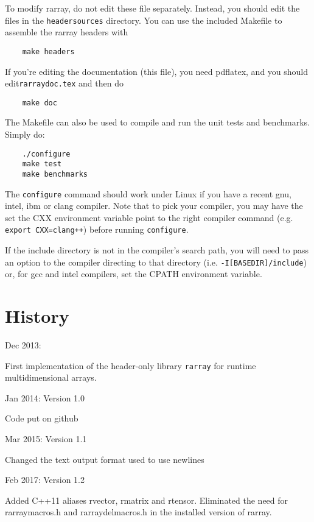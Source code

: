 \documentclass[11pt,twoside]{article}
\begin{document}
To modify rarray, do not edit these file separately. Instead, you
should edit the files in the \texttt{headersources} directory.  You
can use the included Makefile to assemble the rarray headers with
\begin{verbatim}
    make headers
\end{verbatim}

If you're editing the documentation (this file), you need pdflatex, and you should edit\linebreak \texttt{rarraydoc.tex} and then do
\begin{verbatim}
    make doc
\end{verbatim}

The Makefile can also be used to compile and run the unit tests and benchmarks. Simply do:
\begin{verbatim}
    ./configure
    make test
    make benchmarks
\end{verbatim}
The \texttt{configure} command should work under Linux if you have a recent
gnu, intel, ibm or clang compiler.  Note that to pick your compiler,
you may have the set the CXX environment variable point to the right
compiler command (e.g. \texttt{export CXX=clang++}) before running \texttt{configure}.

If the include directory is not in the compiler's search path, you
will need to pass an option to the compiler directing to that
directory (i.e. \texttt{-I[BASEDIR]/include}) or, for gcc and intel compilers,
set the CPATH environment variable.

\newpage

\section{History}

Dec 2013:

First implementation of the header-only library \texttt{rarray} for runtime multidimensional arrays.

\noindent
Jan 2014: Version 1.0

Code put on github

\noindent
Mar 2015: Version 1.1

Changed the text output format used to use newlines

\noindent
Feb 2017: Version 1.2

Added C++11 aliases rvector, rmatrix and rtensor. Eliminated the need
for rarraymacros.h and rarraydelmacros.h in the installed version of
rarray.
\end{document}
